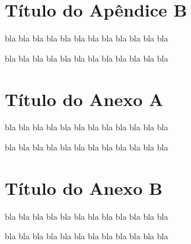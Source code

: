 \documentclass[12pt,a4paper,espaco=umemeio,noindentfirst,oneside,openany,tocpage=plain,pnumromarab,ruledheader,time,anapcustomindent]{abnt}
\begin{document}

\chapter{Título do Apêndice B}

bla bla bla bla bla bla bla bla bla bla bla bla

bla bla bla bla bla bla bla bla bla bla bla bla


\annex


\chapter{Título do Anexo A}

bla bla bla bla bla bla bla bla bla bla bla bla

bla bla bla bla bla bla bla bla bla bla bla bla


\chapter{Título do Anexo B}

bla bla bla bla bla bla bla bla bla bla bla bla

bla bla bla bla bla bla bla bla bla bla bla bla

\end{document}
